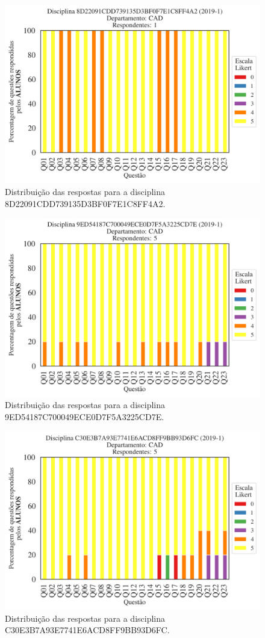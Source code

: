 \documentclass[a4paper,10pt]{article}
\begin{document}
\begin{figure}[h]
\centering
\includegraphics[width=0.485\linewidth]{analise_disciplina_departamento_CAD_ALUNO_TURMA_8D22091CDD739135D3BF0F7E1C8FF4A2.png}
\caption{\label{fig:analise_geral_departamento}                Distribuição das respostas para a disciplina 8D22091CDD739135D3BF0F7E1C8FF4A2.}
\end{figure}
\begin{figure}[h]
\centering
\includegraphics[width=0.485\linewidth]{analise_disciplina_departamento_CAD_ALUNO_TURMA_9ED54187C700049ECE0D7F5A3225CD7E.png}
\caption{\label{fig:analise_geral_departamento}                Distribuição das respostas para a disciplina 9ED54187C700049ECE0D7F5A3225CD7E.}
\end{figure}
\begin{figure}[h]
\centering
\includegraphics[width=0.485\linewidth]{analise_disciplina_departamento_CAD_ALUNO_TURMA_C30E3B7A93E7741E6ACD8FF9BB93D6FC.png}
\caption{\label{fig:analise_geral_departamento}                Distribuição das respostas para a disciplina C30E3B7A93E7741E6ACD8FF9BB93D6FC.}
\end{figure}
\end{document}
